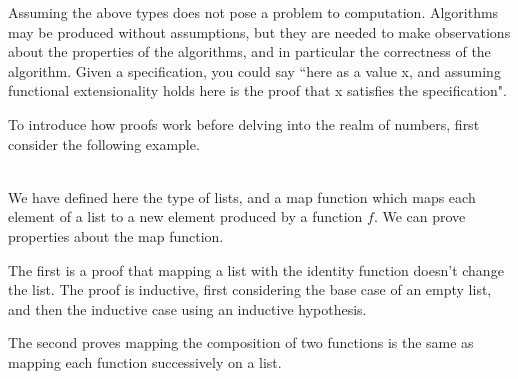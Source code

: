 \documentclass[ProjectReport]{subfiles}
\begin{document}
Assuming the above types does not pose a problem to computation. Algorithms may be produced without assumptions, but they are needed to make observations about the properties of the algorithms, and in particular the correctness of the algorithm. Given a specification, you could say ``here as a value x, and assuming functional extensionality holds here is the proof that x satisfies the specification". 

To introduce how proofs work before delving into the realm of numbers, first consider the following example. \\

\ListDef 

\MapDef \\

We have defined here the type of lists, and a map function which maps each element of a list to a new element produced by a function $f$. We can prove properties about the map function. \\

\MapProofs 

The first is a proof that mapping a list with the identity function doesn't change the list. The proof is inductive, first considering the base case of an empty list, and then the inductive case using an inductive hypothesis.

The second proves mapping the composition of two functions is the same as mapping each function successively on a list. 

\begin{comment}
When building a library, certainly many of the initial proofs may be auto-solved by Agda, but in my experience asking Agda to look for a proof results in an indefinite hang due to the size of the terms I am working with. If Agda compiles the code, then I can sure that the proofs I am writing is correct up to the interpretation of the types I write, but I cannot rely on Agda to auto-generate proofs for me.
\end{comment}
\end{document}

